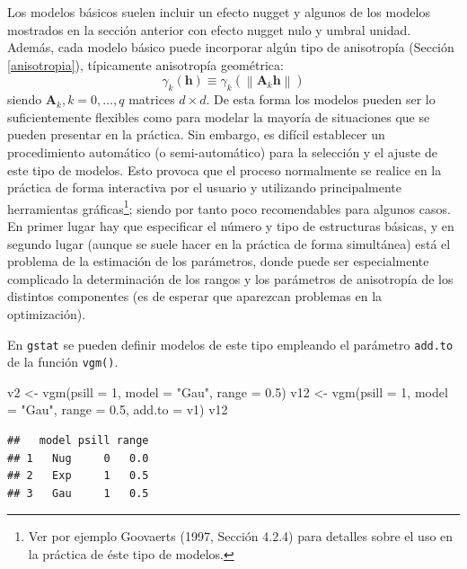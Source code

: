 \documentclass[
  spanish,
]{book}
\newenvironment{Shaded}{\begin{snugshade}}{\end{snugshade}}
\newcommand{\AttributeTok}[1]{\textcolor[rgb]{0.77,0.63,0.00}{#1}}
\newcommand{\DecValTok}[1]{\textcolor[rgb]{0.00,0.00,0.81}{#1}}
\newcommand{\FloatTok}[1]{\textcolor[rgb]{0.00,0.00,0.81}{#1}}
\newcommand{\FunctionTok}[1]{\textcolor[rgb]{0.00,0.00,0.00}{#1}}
\newcommand{\NormalTok}[1]{#1}
\newcommand{\OtherTok}[1]{\textcolor[rgb]{0.56,0.35,0.01}{#1}}
\newcommand{\StringTok}[1]{\textcolor[rgb]{0.31,0.60,0.02}{#1}}
\theoremstyle{break}
\theoremstyle{definition}
\theoremstyle{definition}
\theoremstyle{definition}
\theoremstyle{definition}
\theoremstyle{remark}
\begin{document}
Los modelos básicos suelen incluir un efecto nugget y algunos de los modelos mostrados en la sección anterior con efecto nugget nulo y umbral unidad.
Además, cada modelo básico puede incorporar algún tipo de anisotropía (Sección \ref{anisotropia}), típicamente anisotropía geométrica:
\[\gamma_{k}(\mathbf{h})\equiv \gamma_{k}^{} \left( \left\| \mathbf{A}_{k} \mathbf{h}\right\| \right)\]
siendo \(\mathbf{A}_{k} ,k=0,\ldots,q\) matrices \(d\times d\).
De esta forma los modelos pueden ser lo suficientemente flexibles como para modelar la mayoría de situaciones que se pueden presentar en la práctica.
Sin embargo, es difícil establecer un procedimiento automático (o semi-automático) para la selección y el ajuste de este tipo de modelos.
Esto provoca que el proceso normalmente se realice en la práctica de forma interactiva por el usuario y utilizando principalmente herramientas gráficas\footnote{Ver por ejemplo Goovaerts (1997, Sección 4.2.4) para detalles sobre el uso en la práctica de éste tipo de modelos.}; siendo por tanto poco recomendables para algunos casos.
En primer lugar hay que especificar el número y tipo de estructuras básicas, y en segundo lugar (aunque se suele hacer en la práctica de forma simultánea) está el problema de la estimación de los parámetros, donde puede ser especialmente complicado la determinación de los rangos y los parámetros de anisotropía de los distintos componentes (es de esperar que aparezcan problemas en la optimización).

En \texttt{gstat} se pueden definir modelos de este tipo empleando el parámetro \texttt{add.to} de la función \texttt{vgm()}.

\begin{Shaded}
\begin{Highlighting}[]
\NormalTok{v2 }\OtherTok{\textless{}{-}} \FunctionTok{vgm}\NormalTok{(}\AttributeTok{psill =} \DecValTok{1}\NormalTok{, }\AttributeTok{model =} \StringTok{"Gau"}\NormalTok{, }\AttributeTok{range =} \FloatTok{0.5}\NormalTok{)}
\NormalTok{v12 }\OtherTok{\textless{}{-}} \FunctionTok{vgm}\NormalTok{(}\AttributeTok{psill =} \DecValTok{1}\NormalTok{, }\AttributeTok{model =} \StringTok{"Gau"}\NormalTok{, }\AttributeTok{range =} \FloatTok{0.5}\NormalTok{, }\AttributeTok{add.to =}\NormalTok{ v1)}
\NormalTok{v12}
\end{Highlighting}
\end{Shaded}

\begin{verbatim}
##   model psill range
## 1   Nug     0   0.0
## 2   Exp     1   0.5
## 3   Gau     1   0.5
\end{verbatim}
\end{document}
